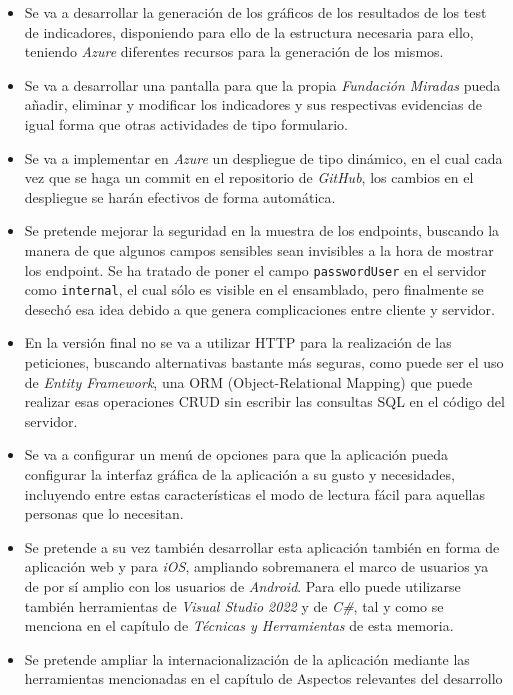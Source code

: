 \begin{itemize}
  
    \item Se va a desarrollar la generación de los gráficos de los resultados de
    los test de indicadores, disponiendo para ello de la estructura necesaria para
    ello, teniendo \textit{Azure} diferentes recursos para la generación de los mismos. %
    \item Se va a desarrollar una pantalla para que la propia \textit{Fundación
    Miradas} pueda añadir, eliminar y modificar los indicadores y sus
    respectivas evidencias de igual forma que otras actividades de tipo formulario. %
    \item Se va a implementar en \textit{Azure} un despliegue de tipo dinámico,
    en el cual cada vez que se haga un commit en el repositorio de
    \textit{GitHub}, los cambios en el despliegue se harán efectivos de forma
    automática. %
    \item Se pretende mejorar la seguridad en la muestra de los endpoints,
    buscando la manera de que algunos campos sensibles sean invisibles a la hora
    de mostrar los endpoint. Se ha tratado de poner el campo
    \texttt{passwordUser} en el servidor como \texttt{internal}, el cual sólo
    es visible en el ensamblado, pero finalmente se desechó esa idea debido a
    que genera complicaciones entre cliente y servidor. %
    \item En la versión final no se va a utilizar HTTP para la realización de
    las peticiones, buscando alternativas bastante más seguras, como puede ser
    el uso de \textit{Entity Framework}, una ORM (Object-Relational Mapping) que
    puede realizar esas operaciones CRUD sin escribir las consultas SQL en el
    código del servidor. %
    \item Se va a configurar un menú de opciones para que la aplicación pueda
    configurar la interfaz gráfica de la aplicación a su gusto y necesidades,
    incluyendo entre estas características el modo de lectura fácil para
    aquellas personas que lo necesitan. %
    \item Se pretende a su vez también desarrollar esta aplicación también en
    forma de aplicación web y para \textit{iOS}, ampliando sobremanera el marco
    de usuarios ya de por sí amplio con los usuarios de \textit{Android}. Para
    ello puede utilizarse también herramientas de \textit{Visual Studio 2022} y
    de \textit{C\#}, tal y como se menciona en el capítulo de \textit{Técnicas y
    Herramientas} de esta memoria.%
    \item Se pretende ampliar la internacionalización de la aplicación mediante
    las herramientas mencionadas en el capítulo de Aspectos relevantes del
    desarrollo %
\end{itemize}

